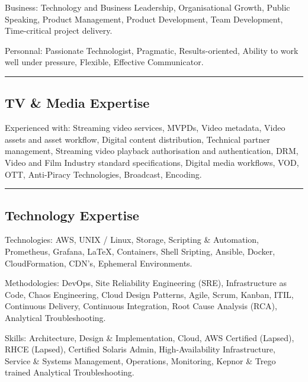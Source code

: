 \documentclass[10pt,a4paper]{article}
\newenvironment{indentsection}[1]%
{\begin{list}{}%
	{\setlength{\leftmargin}{#1}}%
	\item[]%
}
{\end{list}}
\begin{document}
\begin{indentsection}{\parindent}
\begin{description*}
		\item[Business:]
		Technology and Business Leadership, Organisational Growth, Public Speaking, Product Management, Product Development, Team Development, Time-critical project delivery.
    \item[Personnal:]
		Passionate Technologist, Pragmatic, Results-oriented, Ability to work well under pressure, Flexible, Effective Communicator.
\end{description*}
\end{indentsection}

\hrule
\vspace{-0.4em}
\subsection*{TV \& Media Expertise}

\begin{indentsection}{\parindent}
\begin{description*}
	\item[Experienced with:]
	Streaming video services, MVPDs, Video metadata, Video assets and asset workflow, Digital content distribution, Technical partner management, Streaming video playback authorisation and authentication, DRM, Video and Film Industry standard specifications, Digital media workflows, VOD, OTT, Anti-Piracy Technologies, Broadcast, Encoding.

\end{description*}
\end{indentsection}

\hrule
\vspace{-0.4em}
\subsection*{Technology Expertise}

\begin{indentsection}{\parindent}
\begin{description*}
	\item[Technologies:]
	AWS, UNIX / Linux, Storage, Scripting \& Automation, Prometheus, Grafana, \LaTeX, Containers, Shell Sripting, Ansible, Docker, CloudFormation, CDN's, Ephemeral Environments.
	\item[Methodologies:]
	DevOps, Site Reliability Engineering (SRE), Infrastructure as Code, Chaos Engineering, Cloud Design Patterns, Agile, Scrum, Kanban, ITIL, Continuous Delivery, Continuous Integration, Root Cause Analysis (RCA), Analytical Troubleshooting.
	\item[Skills:]
	Architecture, Design \& Implementation, Cloud, AWS Certified (Lapsed), RHCE (Lapsed), Certified Solaris Admin, High-Availability Infrastructure, Service \& Systems Management, Operations, Monitoring, Kepnor \& Trego trained Analytical Troubleshooting.
\end{description*}
\end{indentsection}
\end{document}
